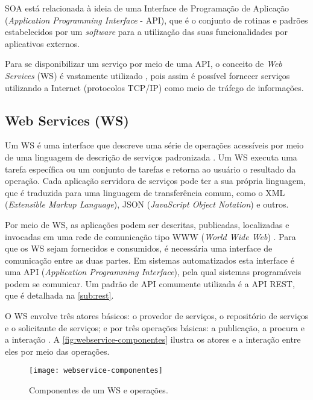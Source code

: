 SOA está relacionada à ideia de uma Interface de Programação de Aplicação (\textit{Application Programming Interface} - API), que é o conjunto de rotinas e padrões estabelecidos por um \textit{software} para a utilização das suas funcionalidades por aplicativos externos.

Para se disponibilizar um serviço por meio de uma API, o conceito de \textit{Web Services} (WS) é vastamente utilizado \cite{souit2013soa}, pois assim é possível fornecer serviços utilizando a Internet (protocolos TCP/IP) como meio de tráfego de informações.

\subsection{Web Services (WS)}
\label{sub:web-services}

Um WS é uma interface que descreve uma série de operações acessíveis por meio de uma linguagem de descrição de serviços padronizada \cite{gottschalk2002webservices}. Um WS executa uma tarefa específica ou um conjunto de tarefas e retorna ao usuário o resultado da operação. Cada aplicação servidora de serviços pode ter a sua própria linguagem, que é traduzida para uma linguagem de transferência comum, como o XML (\textit{Extensible Markup Language}), JSON (\textit{JavaScript Object Notation}) e outros.

Por meio de WS, as aplicações podem ser descritas, publicadas, localizadas e invocadas em uma rede de comunicação tipo WWW (\textit{World Wide Web}) \cite{souit2013soa}. Para que os WS sejam fornecidos e consumidos, é necessária uma interface de comunicação entre as duas partes. Em sistemas automatizados esta interface é uma API (\textit{Application Programming Interface}), pela qual sistemas programáveis podem se comunicar. Um padrão de API comumente utilizada é a API REST, que é detalhada na \autoref{sub:rest}.

O WS envolve três atores básicos: o provedor de serviços, o repositório de serviços e o solicitante de serviços; e por três operações básicas: a publicação, a procura e a interação \cite{gottschalk2002webservices}. A \autoref{fig:webservice-componentes} ilustra os atores e a interação entre eles por meio das operações.

\begin{figure}[htb]
	\centering
	\texttt{[image: webservice-componentes]}
	\caption{Componentes de um WS e operações.}
	\label{fig:webservice-componentes}
\end{figure}


